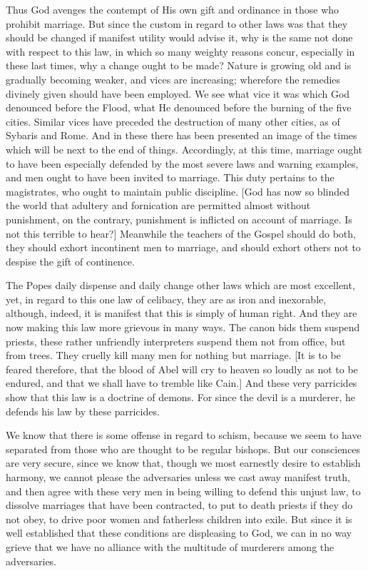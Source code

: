 Thus God avenges the contempt of His own gift and ordinance in those
who prohibit marriage.  But since the custom in regard to other laws
was that they should be changed if manifest utility would advise it,
why is the same not done with respect to this law, in which so many
weighty reasons concur, especially in these last times, why a change
ought to be made?  Nature is growing old and is gradually becoming
weaker, and vices are increasing; wherefore the remedies divinely
given should have been employed.  We see what vice it was which God
denounced before the Flood, what He denounced before the burning of
the five cities.  Similar vices have preceded the destruction of many
other cities, as of Sybaris and Rome.  And in these there has been
presented an image of the times which will be next to the end of
things.  Accordingly, at this time, marriage ought to have been
especially defended by the most severe laws and warning examples, and
men ought to have been invited to marriage.  This duty pertains to
the magistrates, who ought to maintain public discipline.  [God has
now so blinded the world that adultery and fornication are permitted
almost without punishment, on the contrary, punishment is inflicted
on account of marriage.  Is not this terrible to hear?] Meanwhile the
teachers of the Gospel should do both, they should exhort incontinent
men to marriage, and should exhort others not to despise the gift of
continence.

The Popes daily dispense and daily change other laws which are most
excellent, yet, in regard to this one law of celibacy, they are as
iron and inexorable, although, indeed, it is manifest that this is
simply of human right.  And they are now making this law more
grievous in many ways.  The canon bids them suspend priests, these
rather unfriendly interpreters suspend them not from office, but from
trees.  They cruelly kill many men for nothing but marriage.  [It is
to be feared therefore, that the blood of Abel will cry to heaven so
loudly as not to be endured, and that we shall have to tremble like
Cain.] And these very parricides show that this law is a doctrine of
demons.  For since the devil is a murderer, he defends his law by
these parricides.

We know that there is some offense in regard to schism, because we
seem to have separated from those who are thought to be regular
bishops.  But our consciences are very secure, since we know that,
though we most earnestly desire to establish harmony, we cannot
please the adversaries unless we cast away manifest truth, and then
agree with these very men in being willing to defend this unjust law,
to dissolve marriages that have been contracted, to put to death
priests if they do not obey, to drive poor women and fatherless
children into exile.  But since it is well established that these
conditions are displeasing to God, we can in no way grieve that we
have no alliance with the multitude of murderers among the
adversaries.

